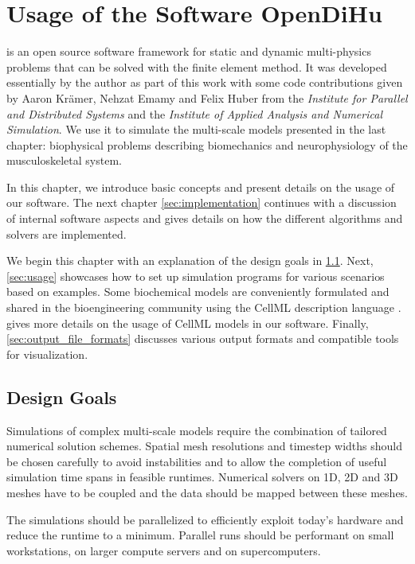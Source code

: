 \chapter{Usage of the Software OpenDiHu}\label{chap:usage}

\Opendihu{} is an open source software framework for static and dynamic multi-physics problems that can be solved with the finite element method. 
It was developed essentially by the author as part of this work with some code contributions given by Aaron Krämer, Nehzat Emamy and Felix Huber from the \emph{Institute for Parallel and Distributed Systems} and the \emph{Institute of Applied Analysis and Numerical Simulation}.
We use it to simulate the multi-scale models presented in the last chapter: biophysical problems describing biomechanics and neurophysiology of the musculoskeletal system.

In this chapter, we introduce basic concepts and present details on the usage of our software. The next chapter \cref{sec:implementation} continues with a discussion of internal software aspects and gives details on how the different algorithms and solvers are implemented.

We begin this chapter with an explanation of the design goals in \cref{sec:design_goals}. Next, \cref{sec:usage} showcases how to set up simulation programs for various scenarios based on examples. Some biochemical models are conveniently formulated and shared in the bioengineering community using the CellML description language \cite{Cellml2003}.  gives more details on the usage of CellML models in our software. Finally, \cref{sec:output_file_formats} discusses various output formats and compatible tools for visualization.

\section{Design Goals}\label{sec:design_goals}

Simulations of complex multi-scale models require the combination of tailored numerical solution schemes. Spatial mesh resolutions and timestep widths should be chosen carefully to avoid instabilities and to allow the completion of useful simulation time spans in feasible runtimes.
Numerical solvers on 1D, 2D and 3D meshes have to be coupled and the data should be mapped between these meshes. 

The simulations should be parallelized to efficiently exploit today's hardware and reduce the runtime to a minimum. Parallel runs should be performant on small workstations, on larger compute servers and on supercomputers. 

